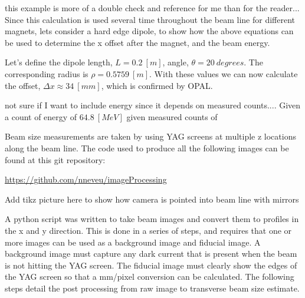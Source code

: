 \documentclass{iitthesis}
\newcommand{\nrnote}[1]{\textsf{{\color{blue}{ NN note:}   #1 }}}
\begin{document}
\nrnote{this example is more of a double check and reference for me than for the reader...}
Since this calculation is used several time throughout the 
beam line for different magnets, lets consider a hard edge 
dipole, to show how the above equations can be used to determine
the x offset after the magnet, and the beam energy. 

Let's define the dipole length, $L=\SI{0.2}{[m]}$, angle, $\theta=\SI{20}{degrees}$. 
The corresponding radius is $\rho = \SI{0.5759}{[m]}$. With these values we can now 
calculate the offset, $\Delta x \approx \SI{34}{[mm]}$, which is confirmed by OPAL. 

\nrnote{not sure if I want to include energy since it depends on measured counts....}
Given a count of  energy of $\SI{64.8}{[MeV]}$ given measured counts of 

 \label{sec:beamsize}
Beam size measurements are taken by using YAG screens at multiple z locations along the beam line.
The code used to produce all the following images can be found at this git repository:

\url{https://github.com/nneveu/imageProcessing}

\nrnote{Add tikz picture here to show how camera is pointed into beam line with mirrors}

A python script was written to take beam images and convert them to profiles in the x and y direction.
This is done in a series of steps, and requires that one or more images can be used as a 
background image and fiducial image. A background image must capture any dark current 
that is present when the beam is not hitting the YAG screen. The fiducial image must 
clearly show the edges of the YAG screen so that a mm/pixel conversion can be calculated.
The following steps detail the post processing from raw image to transverse beam size estimate.



\end{document}
